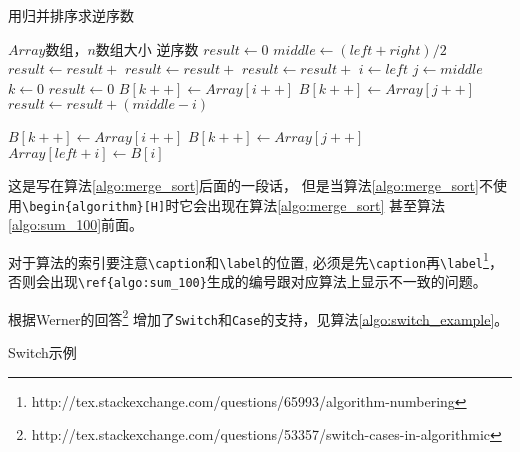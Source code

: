\begin{algorithm}
\caption{用归并排序求逆序数}
\label{algo:merge_sort}
\begin{algorithmic}[1] %
\Require $Array$数组，$n$数组大小 %
\Ensure 逆序数 %
  \State $result \gets 0$
    \State $middle \gets (left + right) / 2$
    \State $result \gets result +$ 
    \State $result \gets result +$ 
    \State $result \gets result +$ 
  \EndIf
  \State {}
\EndFunction
\State %
  \State $i\gets left$
  \State $j\gets middle$
  \State $k\gets 0$
  \State $result \gets 0$
      \State $B[k++]\gets Array[i++]$
    \Else
      \State $B[k++] \gets Array[j++]$
      \State $result \gets result + (middle - i)$
    \EndIf
  \EndWhile
\end{algorithmic}
\end{algorithm}

\begin{algorithm}
\begin{algorithmic}[1]
    \State $B[k++] \gets Array[i++]$
  \EndWhile
    \State $B[k++] \gets Array[j++]$
  \EndWhile
    \State $Array[left + i] \gets B[i]$
  \EndFor
  \State {}
\EndFunction
\end{algorithmic}
\end{algorithm}

这是写在算法\ref{algo:merge_sort}后面的一段话，
但是当算法\ref{algo:merge_sort}不使用\verb+\begin{algorithm}[H]+时它会出现在算法\ref{algo:merge_sort}
甚至算法\ref{algo:sum_100}前面。

对于算法的索引要注意\verb+\caption+和\verb+\label+的位置, 
必须是先\verb+\caption+再\verb+\label+\footnote{http://tex.stackexchange.com/questions/65993/algorithm-numbering}，
否则会出现\verb+\ref{algo:sum_100}+生成的编号跟对应算法上显示不一致的问题。

根据Werner的回答\footnote{http://tex.stackexchange.com/questions/53357/switch-cases-in-algorithmic}
增加了\verb+Switch+和\verb+Case+的支持，见算法\ref{algo:switch_example}。

\begin{algorithm}
\caption{Switch示例}
\label{algo:switch_example}
\begin{algorithmic}[1]
    \EndCase
    \EndCase
    \Default
    \EndDefault
  \EndSwitch
\end{algorithmic}
\end{algorithm}